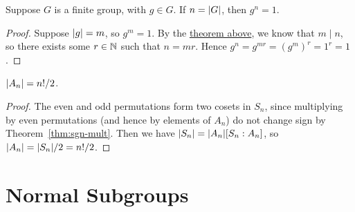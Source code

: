\begin{corollary}\label{cor:order-element-group}
    Suppose \(G\) is a finite group, with \(g \in G\).
    If \(n = \abs{G}\), then \(g^n = 1\).
\end{corollary}
\begin{proof}
    Suppose \(\abs{g} = m\), so \(g^m = 1\).
    By the \hyperref[thm:lagrange]{theorem above},
    we know that \(m \mid n\),
    so there exists some \(r \in \mathbb{N}\) such that \(n = mr\).
    Hence \(g^n = g^{mr} = {(g^m)}^r = 1^r = 1\).
\end{proof}
\begin{corollary}
    \(\abs{A_n} = n!/2\).
\end{corollary}
\begin{proof}
    The even and odd permutations form two cosets in \(S_n\),
    since multiplying by even permutations
    (and hence by elements of \(A_n\)) do not change sign
    by Theorem~\ref{thm:sgn-mult}.
    Then we have \(\abs{S_n} = \abs{A_n}[S_n:A_n]\),
    so \(\abs{A_n} = \abs{S_n}/2 = n!/2\).
\end{proof}


\section{Normal Subgroups}

